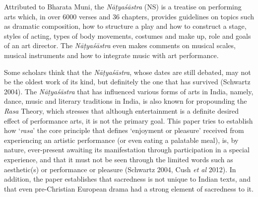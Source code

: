 Attributed to Bharata Muni, the \textsl{Nāṭyaśāstra} (NS) is a treatise on performing arts which, in over 6000 verses and 36 chapters, provides guidelines on topics such as dramatic composition, how to structure a play and how to construct a stage, styles of acting, types of body movements, costumes and make up, role and goals of an art director. The \textsl{Nāṭyaśāstra} even makes comments on musical scales, musical instruments and how to integrate music with art performance.

\newpage

Some scholars think that the \textsl{Nāṭyaśāstra}, whose dates are still debated, may not be the oldest work of its kind, but definitely the one that has survived (Schwartz 2004). The \textsl{Nāṭyaśāstra} that has influenced various forms of arts in India, namely, dance, music and literary traditions in India, is also known for propounding the \textsl{Rasa} Theory, which stresses that although entertainment is a definite desired effect of performance arts, it is not the primary goal. This paper tries to establish how ‘\textsl{rasa}' the core principle that defines ‘enjoyment or pleasure’ received from experiencing an artistic performance (or even eating a palatable meal), is, by nature, ever-present awaiting its manifestation through participation in a special experience, and that it must not be seen through the limited words such as aesthetic(s) or performance or pleasure (Schwartz 2004, Cush \textsl{et al} 2012). In addition, the paper establishes that sacredness is not unique to Indian texts, and that even pre-Christian European drama had a strong element of sacredness to it.

